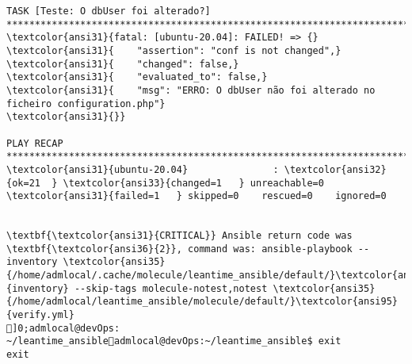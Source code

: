\documentclass{scrartcl}
\begin{document}
\begin{Verbatim}
TASK [Teste: O dbUser foi alterado?] *****************************************************************************************************
\textcolor{ansi31}{fatal: [ubuntu-20.04]: FAILED! => {}
\textcolor{ansi31}{    "assertion": "conf is not changed",}
\textcolor{ansi31}{    "changed": false,}
\textcolor{ansi31}{    "evaluated_to": false,}
\textcolor{ansi31}{    "msg": "ERRO: O dbUser não foi alterado no ficheiro configuration.php"}
\textcolor{ansi31}{}}

PLAY RECAP *******************************************************************************************************************************
\textcolor{ansi31}{ubuntu-20.04}               : \textcolor{ansi32}{ok=21  } \textcolor{ansi33}{changed=1   } unreachable=0    \textcolor{ansi31}{failed=1   } skipped=0    rescued=0    ignored=0


\textbf{\textcolor{ansi31}{CRITICAL}} Ansible return code was \textbf{\textcolor{ansi36}{2}}, command was: ansible-playbook --inventory \textcolor{ansi35}{/home/admlocal/.cache/molecule/leantime_ansible/default/}\textcolor{ansi95}{inventory} --skip-tags molecule-notest,notest \textcolor{ansi35}{/home/admlocal/leantime_ansible/molecule/default/}\textcolor{ansi95}{verify.yml}
]0;admlocal@devOps: ~/leantime_ansibleadmlocal@devOps:~/leantime_ansible$ exit
exit

\end{Verbatim}
\end{document}

